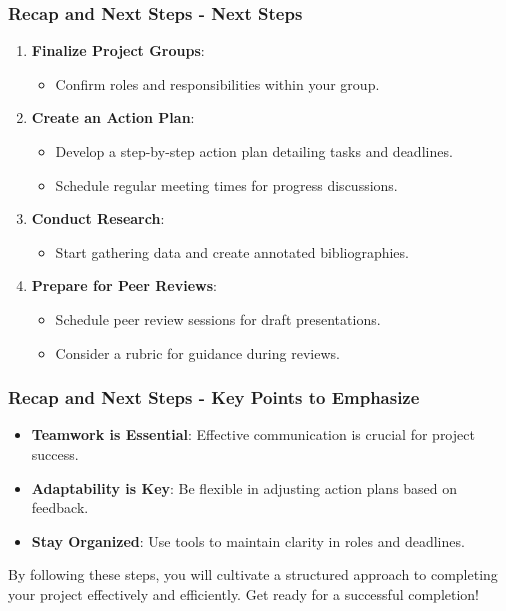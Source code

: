 \documentclass[aspectratio=169]{beamer}
\begin{document}
\begin{frame}[fragile]
    \frametitle{Recap and Next Steps - Next Steps}
    \begin{enumerate}
        \item \textbf{Finalize Project Groups}:
        \begin{itemize}
            \item Confirm roles and responsibilities within your group.
        \end{itemize}
        
        \item \textbf{Create an Action Plan}:
        \begin{itemize}
            \item Develop a step-by-step action plan detailing tasks and deadlines.
            \item Schedule regular meeting times for progress discussions.
        \end{itemize}

        \item \textbf{Conduct Research}:
        \begin{itemize}
            \item Start gathering data and create annotated bibliographies.
        \end{itemize}
        
        \item \textbf{Prepare for Peer Reviews}:
        \begin{itemize}
            \item Schedule peer review sessions for draft presentations.
            \item Consider a rubric for guidance during reviews.
        \end{itemize}
    \end{enumerate}
\end{frame}

\begin{frame}[fragile]
    \frametitle{Recap and Next Steps - Key Points to Emphasize}
    \begin{itemize}
        \item \textbf{Teamwork is Essential}: Effective communication is crucial for project success.
        \item \textbf{Adaptability is Key}: Be flexible in adjusting action plans based on feedback.
        \item \textbf{Stay Organized}: Use tools to maintain clarity in roles and deadlines.
    \end{itemize}
    
    \vfill
    By following these steps, you will cultivate a structured approach to completing your project effectively and efficiently. Get ready for a successful completion!
\end{frame}
\end{document}
